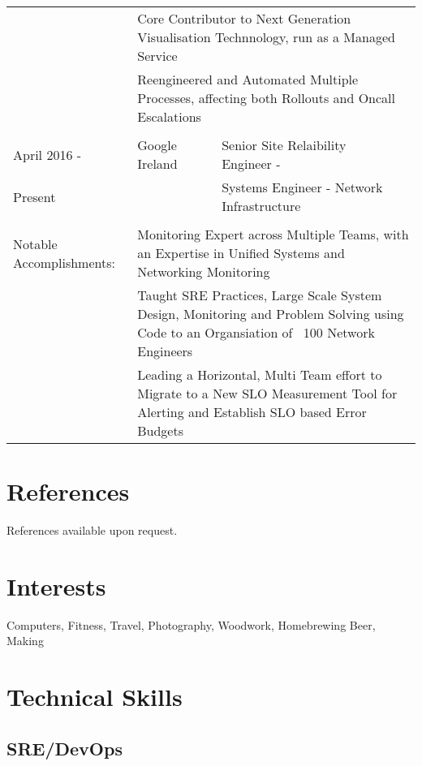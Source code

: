 \documentclass[a4paper, 11pt] {article}
\begin{document}
\begin{tabular}{llll}
			 & \multicolumn{3}{l}{Core Contributor to Next Generation Visualisation Technnology, run as a Managed Service} \\
			 & \multicolumn{3}{l}{Reengineered and Automated Multiple Processes, affecting both Rollouts and Oncall Escalations} \\
		& 				&					 	  &			\\
April 2016 -	&	Google Ireland		&  Senior Site Relaibility Engineer -		  &	\hspace{10mm}	\\
Present		&				&  Systems Engineer - Network Infrastructure      &            		\\
      		&				&              					  &            		\\
Notable Accomplishments: & \multicolumn{3}{l}{Monitoring Expert across Multiple Teams, with an Expertise in Unified Systems and Networking Monitoring} \\
			 & \multicolumn{3}{l}{Taught SRE Practices, Large Scale System Design, Monitoring and Problem Solving using Code to an Organsiation of ~100 Network Engineers} \\
			 & \multicolumn{3}{l}{Leading a Horizontal, Multi Team effort to Migrate to a New SLO Measurement Tool for Alerting and Establish SLO based Error Budgets} \\
			 
\end{tabular}

\pagebreak

\section*{References}

References available upon request.

\section*{Interests}

Computers, Fitness, Travel, Photography, Woodwork, Homebrewing Beer, Making

\section*{Technical Skills}

\subsection*{SRE/DevOps}
\end{document}
